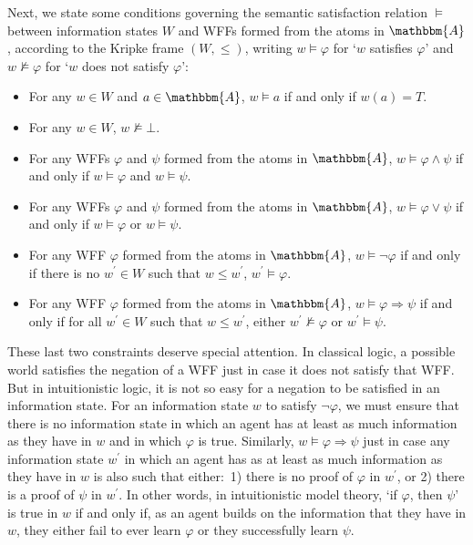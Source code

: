 \documentclass[11pt]{article}
\theoremstyle{definition}
\theoremstyle{remark}
\begin{document}
Next, we state some conditions governing the semantic satisfaction relation $\vDash$ between information states $W$ and WFFs formed from the atoms in $\mathbbm{A}$, according to the Kripke frame $(W,\leq)$, writing $w\vDash\varphi$ for `$w$ satisfies $\varphi$' and $w\not\vDash\varphi$ for `$w$ does not satisfy $\varphi$':
\begin{itemize}
    \item For any $w\in W$ and $a\in\mathbbm{A}$, $w\vDash a$ if and only if $w(a)=T$.

    \item For any $w\in W$, $w\not\vDash\bot$. 

    \item For any WFFs $\varphi$ and $\psi$ formed from the atoms in $\mathbbm{A}$, $w\vDash \varphi\wedge \psi$ if and only if $w\vDash\varphi$ and $w\vDash\psi$.

    \item For any WFFs $\varphi$ and $\psi$ formed from the atoms in $\mathbbm{A}$, $w\vDash \varphi\vee \psi$ if and only if $w\vDash\varphi$ or $w\vDash\psi$.

    \item For any WFF $\varphi$ formed from the atoms in $\mathbbm{A}$, $w\vDash \neg \varphi$ if and only if there is no $w^{\prime}\in W$ such that $w\leq w^{\prime}$, $w^{\prime}\vDash\varphi$. 

    \item For any WFF $\varphi$ formed from the atoms in $\mathbbm{A}$, $w\vDash \varphi\Rightarrow \psi$ if and only if for all $w^{\prime}\in W$ such that $w\leq w^{\prime}$, either $w^{\prime}\not\vDash\varphi$ or $w^{\prime}\vDash\psi$.
\end{itemize}
These last two constraints deserve special attention. In classical logic, a possible world satisfies the negation of a WFF just in case it does not satisfy that WFF. But in intuitionistic logic, it is not so easy for a negation to be satisfied in an information state. For an information state $w$ to satisfy $\neg \varphi$, we must ensure that there is no information state in which an agent has at least as much information as they have in $w$ and in which $\varphi$ is true. Similarly, $w\vDash \varphi\Rightarrow \psi$ just in case any information state $w^{\prime}$ in which an agent has as at least as much information as they have in $w$ is also such that either:\ 1) there is no proof of $\varphi$ in $w^{\prime}$, or 2) there is a proof of $\psi$ in $w^{\prime}$. In other words, in intuitionistic model theory, `if $\varphi$, then $\psi$' is true in $w$ if and only if, as an agent builds on the information that they have in $w$, they either fail to ever learn $\varphi$ or they successfully learn $\psi$.\par 
\end{document}
